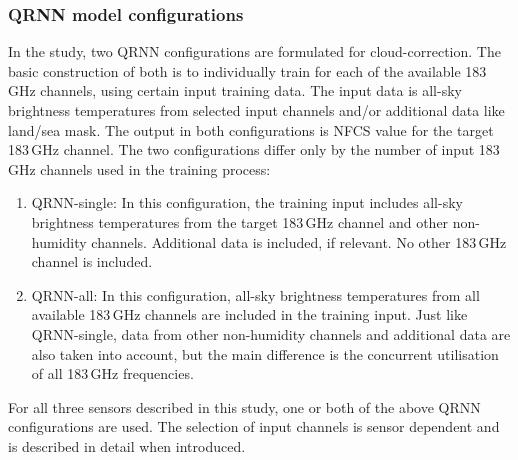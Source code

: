 \documentclass[amt, manuscript]{copernicus}
\begin{document}
\subsubsection{QRNN model configurations}
%
\label{sec:QRNN_configuration}
In the study, two QRNN configurations are formulated for cloud-correction. The basic construction of both is to individually train for each of the available 183\,GHz channels, using certain input training data. The input data is all-sky brightness temperatures from selected input channels and/or additional data like land/sea mask. The output in both configurations is NFCS value for the target 183\,GHz channel. The two configurations differ only by the number of input 183\,GHz channels used in the training process:

\begin{enumerate}
	\item QRNN-single: In this configuration, the training input includes all-sky brightness temperatures from the target 183\,GHz channel and other non-humidity channels. Additional data is included, if relevant. No other 183\,GHz channel is included.  
	
	\item QRNN-all: In this configuration, all-sky brightness temperatures from all available 183\,GHz channels are included in the training input. Just like QRNN-single, data from other non-humidity channels and additional data are also taken into account, but the main difference is the concurrent utilisation of all 183\,GHz frequencies.      
\end{enumerate}

For all three sensors described in this study, one or both of the above QRNN configurations are used. The selection of input channels is sensor dependent and is described in detail when introduced. 
\end{document}
